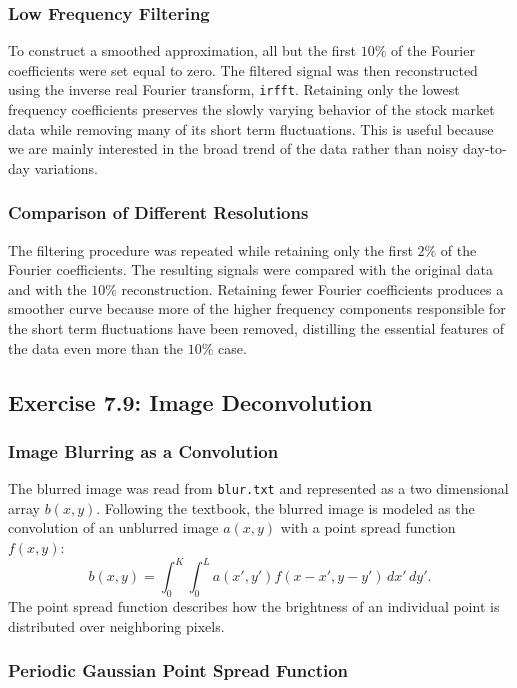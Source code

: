\documentclass[a4paper,11pt]{article}
\begin{document}
\subsubsection*{Low Frequency Filtering}

To construct a smoothed approximation, all but the first $10\%$ of the Fourier coefficients were set equal to zero. The filtered signal was then reconstructed using the inverse real Fourier transform, \texttt{irfft}. Retaining only the lowest frequency coefficients preserves the slowly varying behavior of the stock market data while removing many of its short term fluctuations. This is useful because we are mainly interested in the broad trend of the data rather than noisy day-to-day variations.

\subsubsection*{Comparison of Different Resolutions}

The filtering procedure was repeated while retaining only the first $2\%$ of the Fourier coefficients. The resulting signals were compared with the original data and with the $10\%$ reconstruction. Retaining fewer Fourier coefficients produces a smoother curve because more of the higher frequency components responsible for the short term fluctuations have been removed, distilling the essential features of the data even more than the $10\%$ case.

\subsection*{Exercise 7.9: Image Deconvolution}

\subsubsection*{Image Blurring as a Convolution}
The blurred image was read from \texttt{blur.txt} and represented as a two dimensional array $b(x,y)$. Following the textbook, the blurred image is modeled as the convolution of an unblurred image $a(x,y)$ with a point spread function $f(x,y)$:
\[b(x,y) = \int_0^K\int_0^L a(x',y')f(x-x',y-y')\,dx'\,dy'.\]
The point spread function describes how the brightness of an individual point is distributed over neighboring pixels.

\subsubsection*{Periodic Gaussian Point Spread Function}
\end{document}
